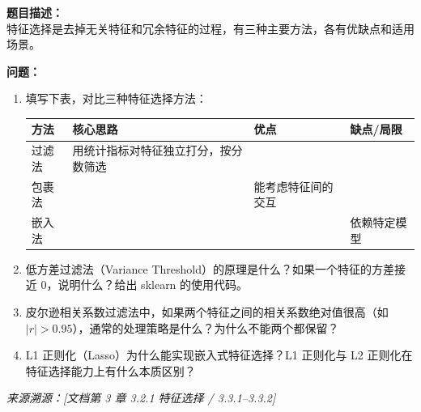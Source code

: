 \documentclass[a4paper,11pt]{ctexart}
\begin{document}
\begin{problembox}
    \textbf{题目描述：}\\
    特征选择是去掉无关特征和冗余特征的过程，有三种主要方法，各有优缺点和适用场景。

    \vspace{0.3cm}
    \textbf{问题：}
    \begin{enumerate}[(1)]
        \item 填写下表，对比三种特征选择方法：

        \begin{center}
        \begin{tabular}{p{2.5cm} p{3.5cm} p{3cm} p{3.5cm}}
            \toprule
            方法 & 核心思路 & 优点 & 缺点/局限 \\
            \midrule
            过滤法 & 用统计指标对特征独立打分，按分数筛选 & \underline{\hspace{2.5cm}} & \underline{\hspace{3cm}} \\[1.5em]
            包裹法 & \underline{\hspace{3cm}} & 能考虑特征间的交互 & \underline{\hspace{3cm}} \\[1.5em]
            嵌入法 & \underline{\hspace{3cm}} & \underline{\hspace{2.5cm}} & 依赖特定模型 \\
            \bottomrule
        \end{tabular}
        \end{center}

        \item 低方差过滤法（Variance Threshold）的原理是什么？如果一个特征的方差接近 0，说明什么？给出 sklearn 的使用代码。

        \item 皮尔逊相关系数过滤法中，如果两个特征之间的相关系数绝对值很高（如 $|r| > 0.95$），通常的处理策略是什么？为什么不能两个都保留？

        \item L1 正则化（Lasso）为什么能实现嵌入式特征选择？L1 正则化与 L2 正则化在特征选择能力上有什么本质区别？
    \end{enumerate}
    {\color{gray}\small\textit{来源溯源：[文档第 3 章 3.2.1 特征选择 / 3.3.1--3.3.2]}}
\end{problembox}
\end{document}
